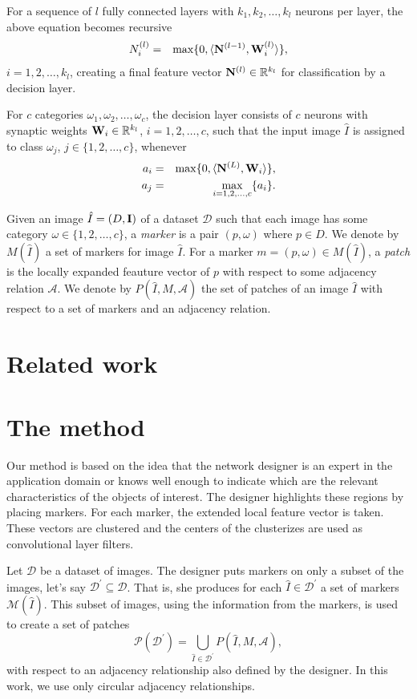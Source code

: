 \documentclass[10pt,twocolumn,letterpaper]{article}
\newcommand{\R}{\mathbb{R}}
\newcommand{\A}{\mathcal{A}}
\newcommand{\D}{\mathcal{D}}
\newcommand{\I}{\hat{I}}
\newcommand{\m}[1]{{\mathrm{\bf #1}}}
\newcommand{\lI}{\m{I}}
\newcommand{\gN}{\m{N}}
\newcommand{\W}{\m{W}}
\newcommand{\M}{\mathcal{M}}
\newcommand{\Pa}{\mathcal{P}}
\newcommand{\pDD}{\D^\prime}
\begin{document}
For a sequence of $l$ fully connected layers with $k_1,  k_2, \ldots, k_l$ neurons per layer, the above equation becomes recursive 
\begin{eqnarray}
  N^{(l)}_i & = & \max\{0,\langle {\gN}^{(l-1)}, {\W}^{(l)}_i\rangle\}, 
\end{eqnarray}
$i=1,2,\ldots,k_l$, creating a final feature vector ${\gN}^{(l)}\in
\R^{k_l}$ for classification by a decision layer.

For $c$ categories $\omega_1, \omega_2, \ldots, \omega_c$, the
decision layer consists of $c$ neurons with synaptic weights ${\W}_i\in \R^{k_l}$, $i=1,2,\ldots,c$, such that the input image
$\I$ is assigned to class $\omega_j$, $j\in \{1,2,\ldots,c\}$,
whenever
\begin{eqnarray}
  a_i & = & \max\{0,\langle {\gN}^{(L)}, {\W}_i\rangle\},\\ 
  a_j & = & \max_{i=1,2,\ldots,c}\{ a_i \}.
\end{eqnarray}

Given an image $\I = (D, \lI)$ of a dataset $\D$ such that each image has some category $\omega \in \{1, 2, \ldots, c\}$, a \textit{marker} is a pair $(p, \omega)$ where $p \in D$. We denote by $M(\I)$ a set of markers for image $\I$. For a marker $m = (p, \omega) \in M(\I)$, a \textit{patch} is the locally expanded feauture vector of $p$ with respect to some adjacency relation $\A$. We denote by $P(\I, M, \A)$ the set of patches of an image $\I$ with respect to a set of markers and an adjacency relation.

\section{Related work}

\section{The method}
Our method is based on the idea that the network designer is an expert in the application domain or knows well enough to indicate which are the relevant characteristics of the objects of interest. The designer highlights these regions by placing markers. For each marker, the extended local feature vector is taken. These vectors are clustered and the centers of the clusterizes are used as convolutional layer filters.

Let $\D$ be a dataset of images. The designer puts markers on only a subset of the images, let's say $\pDD \subseteq \D$. That is, she produces for each $\I \in \pDD$ a set of markers $\M(\I)$.  This subset of images, using the information from the markers, is used to create a set of patches \[\Pa(\pDD) = \bigcup_{\I \in \pDD}{P(\I, M, \A)},\] with respect to an adjacency relationship also defined by the designer. In this work, we use only circular adjacency relationships.
\end{document}
